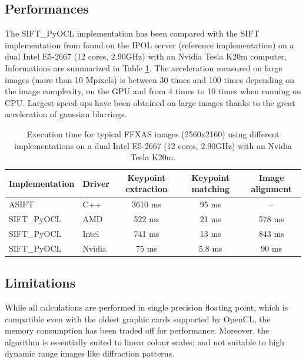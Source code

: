 \documentclass[preprint]{iucr}
\begin{document}
\subsection{Performances}

The SIFT\_PyOCL implementation has been compared with the SIFT
implementation from \cite{ASIFT} found on the IPOL server (reference
implementation) on a dual Intel E5-2667 (12 cores, 2.90GHz) with an Nvidia Tesla
K20m computer, Informations are summarized in Table \ref{bench}. 
The acceleration measured on large images (more than 10 Mpixels) is between 30
times and 100 times depending on the image complexity, on the GPU and from 4
times to 10 times when running on CPU. 
Largest speed-ups have been obtained on large images thanks to the
great acceleration of gaussian blurrings. 

\begin{table}
\caption{Execution time for typical FFXAS images (2560x2160) using different
implementations on a dual Intel E5-2667 (12 cores, 2.90GHz) with an Nvidia Tesla
K20m.}
\label{bench}
\vspace{1mm}
\begin{center}
\begin{tabular}{l l ccc}
Implementation & Driver & Keypoint extraction & Keypoint matching &
Image alignment\\
\hline
ASIFT        &   C++     &   3610 ms  & 95 ms  & --  \\ 
SIFT\_PyOCL  &   AMD  &   522 ms  &  21 ms&  578 ms \\
SIFT\_PyOCL  &   Intel  &   741 ms  &  13 ms&  843 ms\\
SIFT\_PyOCL  &   Nvidia  &    75 ms  &  5.8 ms & 90 ms\\
\end{tabular}
\end{center}
\end{table}

  

\subsection{Limitations}
While all calculations are performed in single precision floating point,
which is
compatible even with the oldest graphic cards supported by OpenCL, the
memory consumption has been traded off for performance. 
Moreover, the algorithm is essentially suited
to linear colour scales; and  not suitable to high dynamic range
images like diffraction patterns.
\end{document}
